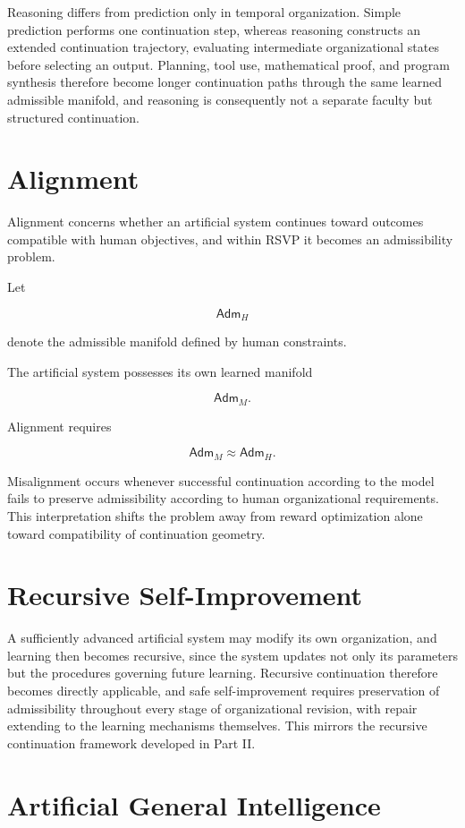 \documentclass[11pt,oneside]{book}
\numberwithin{equation}{chapter}
\theoremstyle{definition}
\theoremstyle{plain}
\newcommand{\Adm}{\mathsf{Adm}}
\begin{document}
Reasoning differs from prediction only in temporal organization. Simple prediction performs one continuation step, whereas reasoning constructs an extended continuation trajectory, evaluating intermediate organizational states before selecting an output. Planning, tool use, mathematical proof, and program synthesis therefore become longer continuation paths through the same learned admissible manifold, and reasoning is consequently not a separate faculty but structured continuation.

\section{Alignment}

Alignment concerns whether an artificial system continues toward outcomes compatible with human objectives, and within RSVP it becomes an admissibility problem.

Let

\[
\Adm_H
\]

denote the admissible manifold defined by human constraints.

The artificial system possesses its own learned manifold

\[
\Adm_M.
\]

Alignment requires

\[
\Adm_M
\approx
\Adm_H.
\]

Misalignment occurs whenever successful continuation according to the model fails to preserve admissibility according to human organizational requirements. This interpretation shifts the problem away from reward optimization alone toward compatibility of continuation geometry.

\section{Recursive Self-Improvement}

A sufficiently advanced artificial system may modify its own organization, and learning then becomes recursive, since the system updates not only its parameters but the procedures governing future learning. Recursive continuation therefore becomes directly applicable, and safe self-improvement requires preservation of admissibility throughout every stage of organizational revision, with repair extending to the learning mechanisms themselves. This mirrors the recursive continuation framework developed in Part II.

\section{Artificial General Intelligence}
\end{document}
